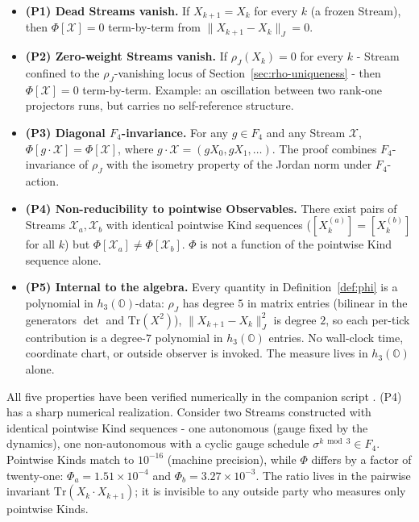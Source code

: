 \documentclass[12pt]{article}
\theoremstyle{remark}
\newcommand{\hthree}{h_3(\mathbb{O})}
\newcommand{\Ffour}{F_4}
\newcommand{\rhoJ}{\rho_J}
\newcommand{\Phiexp}{\Phi}
\newcommand{\Stream}{\mathcal{X}}
\newcommand{\Tr}{\mathrm{Tr}}
\newcommand{\Jnorm}[1]{\lVert #1 \rVert_J}
\begin{document}
\begin{itemize}[leftmargin=2em]
\item \textbf{(P1) Dead Streams vanish.} If $X_{k+1} = X_k$ for every
$k$ (a frozen Stream), then $\Phiexp[\Stream] = 0$ term-by-term from
$\Jnorm{X_{k+1} - X_k} = 0$.

\item \textbf{(P2) Zero-weight Streams vanish.} If $\rhoJ(X_k) = 0$
for every $k$ - Stream confined to the $\rhoJ$-vanishing locus of
Section~\ref{sec:rho-uniqueness} - then $\Phiexp[\Stream] = 0$
term-by-term. Example: an oscillation between two rank-one projectors
runs, but carries no self-reference structure.

\item \textbf{(P3) Diagonal $\Ffour$-invariance.} For any $g \in \Ffour$
and any Stream $\Stream$,
$\Phiexp[g \cdot \Stream] = \Phiexp[\Stream]$, where
$g \cdot \Stream = (gX_0, gX_1, \ldots)$. The proof combines
$\Ffour$-invariance of $\rhoJ$ with the isometry property of the Jordan
norm under $\Ffour$-action.

\item \textbf{(P4) Non-reducibility to pointwise Observables.} There exist
pairs of Streams $\Stream_a, \Stream_b$ with identical pointwise Kind
sequences ($[X_k^{(a)}] = [X_k^{(b)}]$ for all $k$) but
$\Phiexp[\Stream_a] \neq \Phiexp[\Stream_b]$. $\Phiexp$ is not a
function of the pointwise Kind sequence alone.

\item \textbf{(P5) Internal to the algebra.} Every quantity in
Definition~\ref{def:phi} is a polynomial in $\hthree$-data: $\rhoJ$ has
degree $5$ in matrix entries (bilinear in the generators $\det$ and
$\Tr(X^2)$), $\Jnorm{X_{k+1} - X_k}^2$ is degree $2$, so each per-tick
contribution is a degree-$7$ polynomial in $\hthree$ entries. No
wall-clock time, coordinate chart, or outside observer is invoked. The
measure lives in $\hthree$ alone.
\end{itemize}

All five properties have been verified numerically in the companion
script \cite{phi-numerics}. (P4) has a sharp numerical realization.
Consider two Streams constructed with identical
pointwise Kind sequences - one autonomous (gauge fixed by the dynamics),
one non-autonomous with a cyclic gauge schedule
$\sigma^{k \bmod 3} \in \Ffour$. Pointwise Kinds match to
$10^{-16}$ (machine precision), while $\Phiexp$ differs by a factor of
twenty-one: $\Phiexp_a = 1.51 \times 10^{-4}$ and
$\Phiexp_b = 3.27 \times 10^{-3}$. The ratio lives in the pairwise
invariant $\Tr(X_k \cdot X_{k+1})$; it is invisible to any outside
party who measures only pointwise Kinds.
\end{document}
